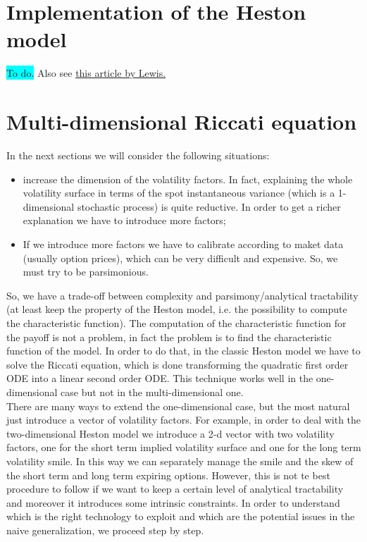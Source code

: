\section{Implementation of the Heston model}
\colorbox{cyan}{To do.} Also see \href{http://www.optioncity.net/pubs/Ch2Excerpt.pdf}{this article by Lewis.}

\section{Multi-dimensional Riccati equation}
In the next sections we will consider the following situations:
\begin{itemize}
    \item increase the dimension of the volatility factors. In fact, explaining the whole volatility surface in terms of the spot instantaneous variance (which is a 1-dimensional stochastic process) is quite reductive. In order to get a richer explanation we have to introduce more factors;
    \item If we introduce more factors we have to calibrate according to maket data (usually option prices), which can be very difficult and expensive. So, we must try to be parsimonious.
\end{itemize}
So, we have a trade-off between complexity and parsimony/analytical tractability (at least keep the property of the Heston model, i.e. the possibility to compute the characteristic function). The computation of the characteristic function for the payoff is not a problem, in fact the problem is to find the characteristic function of the model. In order to do that, in the classic Heston model we have to solve the Riccati equation, which is done transforming the quadratic first order ODE into a linear second order ODE. This technique works well in the one-dimensional case but not in the multi-dimensional one.  \\
There are many ways to extend the one-dimensional case, but the most natural just introduce a vector of volatility factors. For example, in order to deal with the two-dimensional Heston model we introduce a 2-d vector with two volatility factors, one for the short term implied volatility surface and one for the long term volatility smile. In this way we can separately manage the smile and the skew of the short term and long term expiring options. However, this is not te best procedure to follow if we want to keep a certain level of analytical tractability and moreover it introduces some intrinsic constraints. In order to understand which is the right technology to exploit and which are the potential issues in the naive generalization, we proceed step by step.\\
